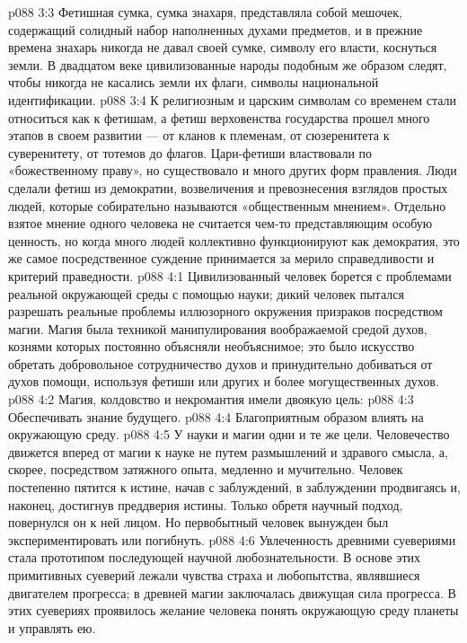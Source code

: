 \vs p088 3:3 Фетишная сумка, сумка знахаря, представляла собой мешочек, содержащий солидный набор наполненных духами предметов, и в прежние времена знахарь никогда не давал своей сумке, символу его власти, коснуться земли. В двадцатом веке цивилизованные народы подобным же образом следят, чтобы никогда не касались земли их флаги, символы национальной идентификации.
\vs p088 3:4 К религиозным и царским символам со временем стали относиться как к фетишам, а фетиш верховенства государства прошел много этапов в своем развитии --- от кланов к племенам, от сюзеренитета к суверенитету, от тотемов до флагов. Цари\hyp{}фетиши властвовали по «божественному праву», но существовало и много других форм правления. Люди сделали фетиш из демократии, возвеличения и превознесения взглядов простых людей, которые собирательно называются «общественным мнением». Отдельно взятое мнение одного человека не считается чем\hyp{}то представляющим особую ценность, но когда много людей коллективно функционируют как демократия, это же самое посредственное суждение принимается за мерило справедливости и критерий праведности.
\vs p088 4:1 Цивилизованный человек борется с проблемами реальной окружающей среды с помощью науки; дикий человек пытался разрешать реальные проблемы иллюзорного окружения призраков посредством магии. Магия была техникой манипулирования воображаемой средой духов, кознями которых постоянно объясняли необъяснимое; это было искусство обретать добровольное сотрудничество духов и принудительно добиваться от духов помощи, используя фетиши или других и более могущественных духов.
\vs p088 4:2 Магия, колдовство и некромантия имели двоякую цель:
\vs p088 4:3 \bibnobreakspace Обеспечивать знание будущего.
\vs p088 4:4 \bibnobreakspace Благоприятным образом влиять на окружающую среду.
\vs p088 4:5 \pc У науки и магии одни и те же цели. Человечество движется вперед от магии к науке не путем размышлений и здравого смысла, а, скорее, посредством затяжного опыта, медленно и мучительно. Человек постепенно пятится к истине, начав с заблуждений, в заблуждении продвигаясь и, наконец, достигнув преддверия истины. Только обретя научный подход, повернулся он к ней лицом. Но первобытный человек вынужден был экспериментировать или погибнуть.
\vs p088 4:6 Увлеченность древними суевериями стала прототипом последующей научной любознательности. В основе этих примитивных суеверий лежали чувства страха и любопытства, являвшиеся двигателем прогресса; в древней магии заключалась движущая сила прогресса. В этих суевериях проявилось желание человека понять окружающую среду планеты и управлять ею.

